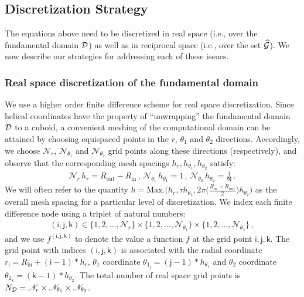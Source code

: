 \documentclass[preprint,12pt, 3p, sort&compress]{elsarticle}
\begin{document}
\subsection{Discretization Strategy}
\label{subsec:discretization}
The equations above need to be discretized in real space (i.e., over the fundamental domain ${\cal D}$) as well as in reciprocal space (i.e., over the set $\widehat{{\cal G}}$). We now describe our strategies for addressing each of these issues. 
\subsubsection{Real space discretization of the fundamental domain}
\label{subsubsec:real_space_discretization}
We use a higher order finite difference scheme \citep{chelikowsky1994finite, Chelikowsky_Saad_1,  Chelikowsky_Saad_2, kikuji2005first, ghosh2017sparc_1, ghosh2017sparc_2, ghosh2019symmetry, banerjee2021ab} for real space discretization. Since helical coordinates have the property of ``unwrapping'' the fundamental domain ${\cal D}$ to a cuboid, a convenient meshing of the computational domain can be attained by choosing equispaced points in the $r$, $\theta_1$ and $\theta_2$ directions. Accordingly, we choose $\mathscr{N}_{r}$, $\mathscr{N}_{\theta_1}$ and $\mathscr{N}_{\theta_2}$ grid points along these directions (respectively), and observe that the corresponding mesh spacings $h_{r}, h_{\theta_1}, h_{\theta_2}$ satisfy:
\begin{align}
\mathscr{N}_{r}\,h_{r} = R_{\text{out}} - R_{\text{in}} \,,\,\mathscr{N}_{\theta_1}\,h_{\theta_1} = 1\,,\,\mathscr{N}_{\theta_2}\,h_{\theta_2} = \frac{1}{\mathfrak{N}}\,.
\end{align}
We will often refer to the quantity $h = \text{Max.}\bigg(h_r, \tau h_{\theta_1}, 2\pi\big(\frac{R_{\text{in}} + R_{\text{out}}}{2}\big)h_{\theta_2}\bigg)$ as the overall mesh spacing for a particular level of discretization. We index each finite difference node using a triplet of natural numbers:
\begin{align}
(\mathsf{i}, \mathsf{j}, \mathsf{k}) \in \{1,2,\ldots,\mathscr{N}_{r}\} \times \{1,2,\ldots,\mathscr{N}_{\theta_1}\} \times \{1,2,\ldots,\mathscr{N}_{\theta_2}\}\,,
\end{align}
and we use $f^{(\mathsf{i}, \mathsf{j}, \mathsf{k})}$ to denote the value a function $f$ at the grid point $\mathsf{i}, \mathsf{j}, \mathsf{k}$. The grid point with indices $(\mathsf{i}, \mathsf{j}, \mathsf{k})$ is associated with the radial coordinate $r_{\mathsf{i}} = R_{\text{in}} + (\mathsf{i} - 1) * h_r$, $\theta_1$ coordinate $\theta_{1_{\mathsf{j}}} =  (\mathsf{j} - 1) * h_{\theta_1}$ and $\theta_2$ coordinate $\theta_{2_{\mathsf{k}}} =  (\mathsf{k} - 1) * h_{\theta_2}$. The total number of real space grid points is $N_{{\cal D}} = \mathscr{N}_{r} \times \mathscr{N}_{\theta_1} \times \mathscr{N}_{\theta_2}$.
\end{document}
